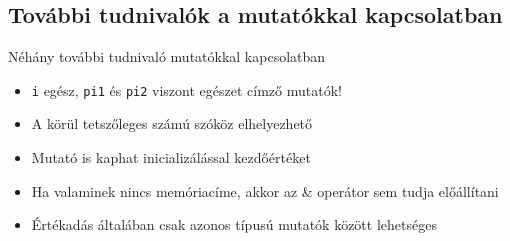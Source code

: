\documentclass[usenames,dvipsnames,aspectratio=169]{beamer}
\begin{document}
\subsection{További tudnivalók a mutatókkal kapcsolatban}
\begin{frame}
  Néhány további tudnivaló mutatókkal kapcsolatban
  \begin{itemize}
    \item {} \texttt{i} egész, \texttt{pi1} és \texttt{pi2} viszont egészet címző mutatók!
    \item A \kiemel{*} körül tetszőleges számú szóköz elhelyezhető
    \item Mutató is kaphat inicializálással kezdőértéket
  \end{itemize}
  \begin{exampleblock}{}
    
  \end{exampleblock}
\end{frame}

\begin{frame}
  \begin{itemize}
    \item Ha valaminek nincs memóriacíme, akkor az \& operátor sem tudja előállítani
  \end{itemize}
  \begin{alertblock}{}
    \small
    
  \end{alertblock}
  \begin{itemize}
    \item Értékadás általában csak azonos típusú mutatók között lehetséges
  \end{itemize}
  \begin{alertblock}{}
    \small
    
  \end{alertblock}
\end{frame}
\end{document}
